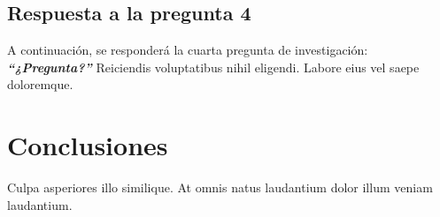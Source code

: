 \subsection{Respuesta a la pregunta 4}
A continuación, se responderá la cuarta pregunta de investigación: \textbf{\textit{``¿Pregunta?''}}\newline
Reiciendis voluptatibus nihil eligendi. Labore eius vel saepe doloremque.

\section{Conclusiones}
Culpa asperiores illo similique. At omnis natus laudantium dolor illum veniam laudantium.
